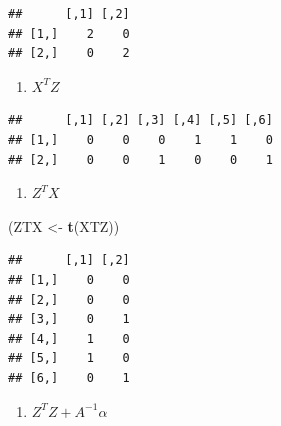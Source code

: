 \documentclass[]{article}
\newenvironment{Shaded}{\begin{snugshade}}{\end{snugshade}}
\newcommand{\KeywordTok}[1]{\textcolor[rgb]{0.13,0.29,0.53}{\textbf{#1}}}
\newcommand{\StringTok}[1]{\textcolor[rgb]{0.31,0.60,0.02}{#1}}
\newcommand{\OperatorTok}[1]{\textcolor[rgb]{0.81,0.36,0.00}{\textbf{#1}}}
\newcommand{\NormalTok}[1]{#1}
\providecommand{\tightlist}{%
  \setlength{\itemsep}{0pt}\setlength{\parskip}{0pt}}
\begin{document}
\begin{Shaded}
\end{Shaded}

\begin{verbatim}
##      [,1] [,2]
## [1,]    2    0
## [2,]    0    2
\end{verbatim}

\begin{enumerate}
\def\labelenumi{\arabic{enumi}.}
\setcounter{enumi}{1}
\tightlist
\item
  \(X^TZ\)
\end{enumerate}

\begin{Shaded}
\end{Shaded}

\begin{verbatim}
##      [,1] [,2] [,3] [,4] [,5] [,6]
## [1,]    0    0    0    1    1    0
## [2,]    0    0    1    0    0    1
\end{verbatim}

\begin{enumerate}
\def\labelenumi{\arabic{enumi}.}
\setcounter{enumi}{2}
\tightlist
\item
  \(Z^TX\)
\end{enumerate}

\begin{Shaded}
\begin{Highlighting}[]
\NormalTok{(ZTX <-}\StringTok{ }\KeywordTok{t}\NormalTok{(XTZ))}
\end{Highlighting}
\end{Shaded}

\begin{verbatim}
##      [,1] [,2]
## [1,]    0    0
## [2,]    0    0
## [3,]    0    1
## [4,]    1    0
## [5,]    1    0
## [6,]    0    1
\end{verbatim}

\begin{enumerate}
\def\labelenumi{\arabic{enumi}.}
\setcounter{enumi}{3}
\tightlist
\item
  \(Z^TZ + A^{-1}\alpha\)
\end{enumerate}
\end{document}
